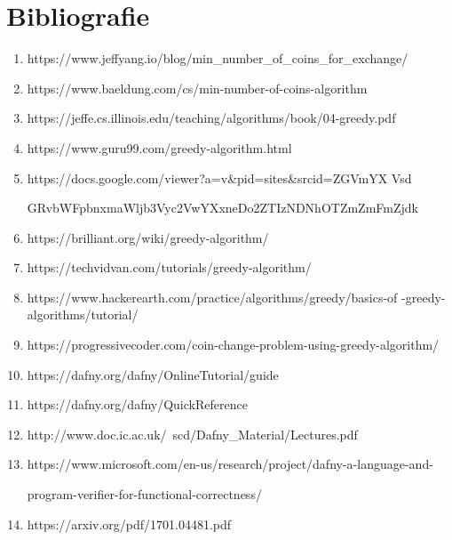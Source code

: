 \chapter*{Bibliografie} 

\begin{enumerate}
    \item https://www.jeffyang.io/blog/min\_number\_of\_coins\_for\_exchange/
    \item https://www.baeldung.com/cs/min-number-of-coins-algorithm
    \item https://jeffe.cs.illinois.edu/teaching/algorithms/book/04-greedy.pdf
    \item https://www.guru99.com/greedy-algorithm.html
    \item https://docs.google.com/viewer?a=v\&pid=sites\&srcid=ZGVmYX Vsd \par GRvbWFpbnxmaWljb3Vyc2VwYXxneDo2ZTIzNDNhOTZmZmFmZjdk
    \item https://brilliant.org/wiki/greedy-algorithm/
    \item https://techvidvan.com/tutorials/greedy-algorithm/
    \item https://www.hackerearth.com/practice/algorithms/greedy/basics-of -greedy-algorithms/tutorial/
    \item https://progressivecoder.com/coin-change-problem-using-greedy-algorithm/
    \item https://dafny.org/dafny/OnlineTutorial/guide
    \item https://dafny.org/dafny/QuickReference
    \item http://www.doc.ic.ac.uk/~scd/Dafny\_Material/Lectures.pdf
    \item https://www.microsoft.com/en-us/research/project/dafny-a-language-and-\par program-verifier-for-functional-correctness/
    \item https://arxiv.org/pdf/1701.04481.pdf
\end{enumerate}